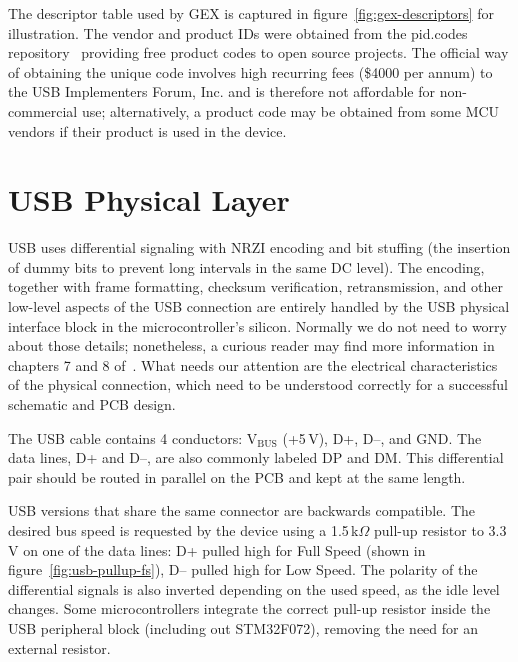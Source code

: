 The descriptor table used by GEX is captured in figure~\ref{fig:gex-descriptors} for illustration. The vendor and product IDs were obtained from the pid.codes repository~\cite{pidcodes} providing free product codes to open source projects. The official way of obtaining the unique code involves high recurring fees (\$4000 per annum) to the USB Implementers Forum, Inc. and is therefore not affordable for non-commercial use; alternatively, a product code may be obtained from some \gls{MCU} vendors if their product is used in the device.
\newpage



\section{USB Physical Layer}

\gls{USB} uses differential signaling with \gls{NRZI} encoding and bit stuffing (the insertion of dummy bits to prevent long intervals in the same \gls{DC} level). The encoding, together with frame formatting, checksum verification, retransmission, and other low-level aspects of the \gls{USB} connection are entirely handled by the \gls{USB} physical interface block in the microcontroller's silicon. Normally we do not need to worry about those details; nonetheless, a curious reader may find more information in chapters 7 and 8 of~\cite{usbif-spec}. What needs our attention are the electrical characteristics of the physical connection, which need to be understood correctly for a successful schematic and \gls{PCB} design.

The \gls{USB} cable contains 4 conductors: V$_\mathrm{BUS}$ (+5\,V), D+, D--, and \gls{GND}. The data lines, D+ and D--, are also commonly labeled DP and DM. This differential pair should be routed in parallel on the \gls{PCB} and kept at the same length.

\gls{USB} versions that share the same connector are backwards compatible. The desired bus speed is requested by the device using a 1.5\,k$\Omega$ pull-up resistor to 3.3\,V on one of the data lines: D+ pulled high for Full Speed (shown in figure~\ref{fig:usb-pullup-fs}), D-- pulled high for Low Speed. The polarity of the differential signals is also inverted depending on the used speed, as the idle level changes. Some microcontrollers integrate the correct pull-up resistor inside the \gls{USB} peripheral block (including out STM32F072), removing the need for an external resistor.

